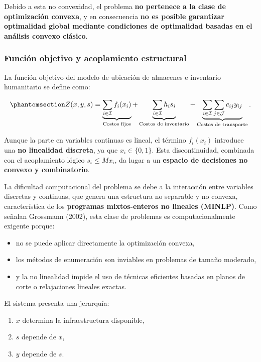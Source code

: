 \documentclass[
  spanish,
  us-letterpaper,
]{scrreprt}
\providecommand{\tightlist}{%
  \setlength{\itemsep}{0pt}\setlength{\parskip}{0pt}}
\numberwithin{equation}{section}
\begin{document}
Debido a esta no convexidad, el problema \textbf{no pertenece a la clase
de optimización convexa}, y en consecuencia \textbf{no es posible
garantizar optimalidad global mediante condiciones de optimalidad
basadas en el análisis convexo clásico}.

\subsubsection{Función objetivo y acoplamiento
estructural}\label{sec-acoplamiento}

La función objetivo del modelo de ubicación de almacenes e inventario
humanitario se define como:

\begin{equation}\phantomsection\label{eq-Z_xys}{
Z(x,y,s) 
= 
\underbrace{\sum_{i\in\mathcal{I}} f_i(x_i)}_{\text{Costos fijos}}
+ \underbrace{\sum_{i\in\mathcal{I}} h_i s_i}_{\text{Costos de inventario}}
+ \underbrace{\sum_{i\in\mathcal{I}}\sum_{j\in\mathcal{J}} c_{ij} y_{ij}}_{\text{Costos de transporte}}.
}\end{equation}

Aunque la parte en variables continuas es lineal, el término
\(f_i(x_i)\) introduce una \textbf{no linealidad discreta}, ya que
\(x_i \in \{0,1\}\). Esta discontinuidad, combinada con el acoplamiento
lógico \(s_i \leq M x_i\), da lugar a un \textbf{espacio de decisiones
no convexo y combinatorio}.

La dificultad computacional del problema se debe a la interacción entre
variables discretas y continuas, que genera una estructura no separable
y no convexa, característica de los \textbf{programas mixtos-enteros no
lineales (MINLP)}. Como señalan Grossmann (2002), esta clase de
problemas es computacionalmente exigente porque:

\begin{itemize}
\tightlist
\item
  no se puede aplicar directamente la optimización convexa,
\item
  los métodos de enumeración son inviables en problemas de tamaño
  moderado,
\item
  y la no linealidad impide el uso de técnicas eficientes basadas en
  planos de corte o relajaciones lineales exactas.
\end{itemize}

El sistema presenta una jerarquía:

\begin{enumerate}
\def\labelenumi{\arabic{enumi}.}
\tightlist
\item
  \(x\) determina la infraestructura disponible,\\
\item
  \(s\) depende de \(x\),\\
\item
  \(y\) depende de \(s\).
\end{enumerate}
\end{document}
